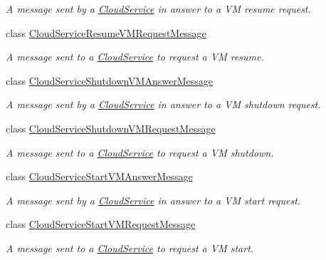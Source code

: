 \begin{DoxyCompactItemize}
\begin{DoxyCompactList}\small\item\em A message sent by a \hyperlink{classwrench_1_1_cloud_service}{Cloud\+Service} in answer to a VM resume request. \end{DoxyCompactList}\item 
class \hyperlink{classwrench_1_1_cloud_service_resume_v_m_request_message}{Cloud\+Service\+Resume\+V\+M\+Request\+Message}
\begin{DoxyCompactList}\small\item\em A message sent to a \hyperlink{classwrench_1_1_cloud_service}{Cloud\+Service} to request a VM resume. \end{DoxyCompactList}\item 
class \hyperlink{classwrench_1_1_cloud_service_shutdown_v_m_answer_message}{Cloud\+Service\+Shutdown\+V\+M\+Answer\+Message}
\begin{DoxyCompactList}\small\item\em A message sent by a \hyperlink{classwrench_1_1_cloud_service}{Cloud\+Service} in answer to a VM shutdown request. \end{DoxyCompactList}\item 
class \hyperlink{classwrench_1_1_cloud_service_shutdown_v_m_request_message}{Cloud\+Service\+Shutdown\+V\+M\+Request\+Message}
\begin{DoxyCompactList}\small\item\em A message sent to a \hyperlink{classwrench_1_1_cloud_service}{Cloud\+Service} to request a VM shutdown. \end{DoxyCompactList}\item 
class \hyperlink{classwrench_1_1_cloud_service_start_v_m_answer_message}{Cloud\+Service\+Start\+V\+M\+Answer\+Message}
\begin{DoxyCompactList}\small\item\em A message sent by a \hyperlink{classwrench_1_1_cloud_service}{Cloud\+Service} in answer to a VM start request. \end{DoxyCompactList}\item 
class \hyperlink{classwrench_1_1_cloud_service_start_v_m_request_message}{Cloud\+Service\+Start\+V\+M\+Request\+Message}
\begin{DoxyCompactList}\small\item\em A message sent to a \hyperlink{classwrench_1_1_cloud_service}{Cloud\+Service} to request a VM start. \end{DoxyCompactList}\item 

\end{DoxyCompactItemize}
